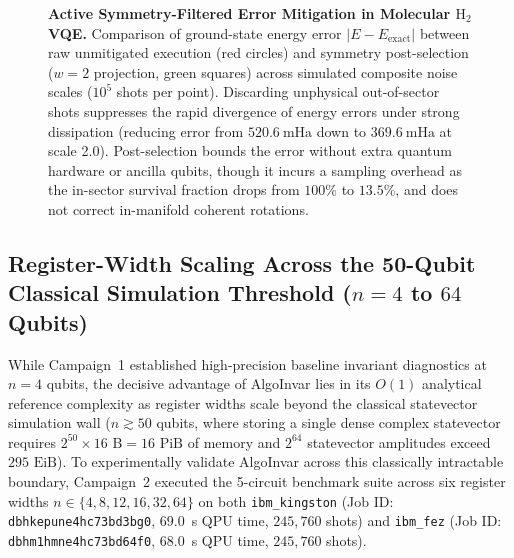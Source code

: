 \documentclass[aps,pra,reprint,superscriptaddress,floatfix,nofootinbib]{revtex4-2}
\begin{document}
\begin{figure}[t]
{%
}
\caption{\textbf{Active Symmetry-Filtered Error Mitigation in Molecular $\mathrm{H}_2$ VQE.} 
Comparison of ground-state energy error $|E - E_{\text{exact}}|$ between raw unmitigated execution (red circles) and symmetry post-selection ($w = 2$ projection, green squares) across simulated composite noise scales ($10^5$ shots per point). Discarding unphysical out-of-sector shots suppresses the rapid divergence of energy errors under strong dissipation (reducing error from $520.6\ \text{mHa}$ down to $369.6\ \text{mHa}$ at scale 2.0). Post-selection bounds the error without extra quantum hardware or ancilla qubits, though it incurs a sampling overhead as the in-sector survival fraction drops from $100\%$ to $13.5\%$, and does not correct in-manifold coherent rotations.}
\label{fig:symmetry_mitigation}
\end{figure}

\subsection{Register-Width Scaling Across the 50-Qubit Classical Simulation Threshold (\texorpdfstring{$n = 4$ to $64$}{n = 4 to 64} Qubits)}
\label{sec:scaling_results}
While Campaign~1 established high-precision baseline invariant diagnostics at $n = 4$ qubits, the decisive advantage of AlgoInvar lies in its $O(1)$ analytical reference complexity as register widths scale beyond the classical statevector simulation wall ($n \gtrsim 50$ qubits, where storing a single dense complex statevector requires $2^{50} \times 16\text{ B} = 16\text{ PiB}$ of memory and $2^{64}$ statevector amplitudes exceed $295\text{ EiB}$). To experimentally validate AlgoInvar across this classically intractable boundary, Campaign~2 executed the 5-circuit benchmark suite across six register widths $n \in \{4, 8, 12, 16, 32, 64\}$ on both \texttt{ibm\_kingston} (Job ID: \texttt{dbhkepune4hc73bd3bg0}, $69.0$~s QPU time, $245,760$ shots) and \texttt{ibm\_fez} (Job ID: \texttt{dbhm1hmne4hc73bd64f0}, $68.0$~s QPU time, $245,760$ shots).
\end{document}
